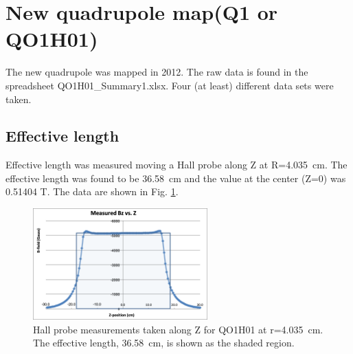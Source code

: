 \documentclass[12pt]{article}
\begin{document}
\section{New quadrupole map(Q1 or QO1H01)}
The new quadrupole was mapped in 2012. The raw data is found in the spreadsheet QO1H01\_Summary1.xlsx. Four (at least) different data sets were taken.
\subsection{Effective length}
Effective length was measured moving a Hall probe along Z at R=4.035~cm. The effective length was found to be 36.58~cm and the value at the center (Z=0) was 0.51404 T. The data are shown in Fig. \ref{fig:Q1_eff_len}.
\begin{figure}[!h]
\centering
\includegraphics[width=0.6\textwidth]{QO1H01_Eff_Len.png}
\caption{\label{fig:Q1_eff_len}Hall probe measurements taken along Z for QO1H01 at r=4.035~cm. The effective length, 36.58~cm, is shown as the shaded region.}
\end{figure}
\end{document}
